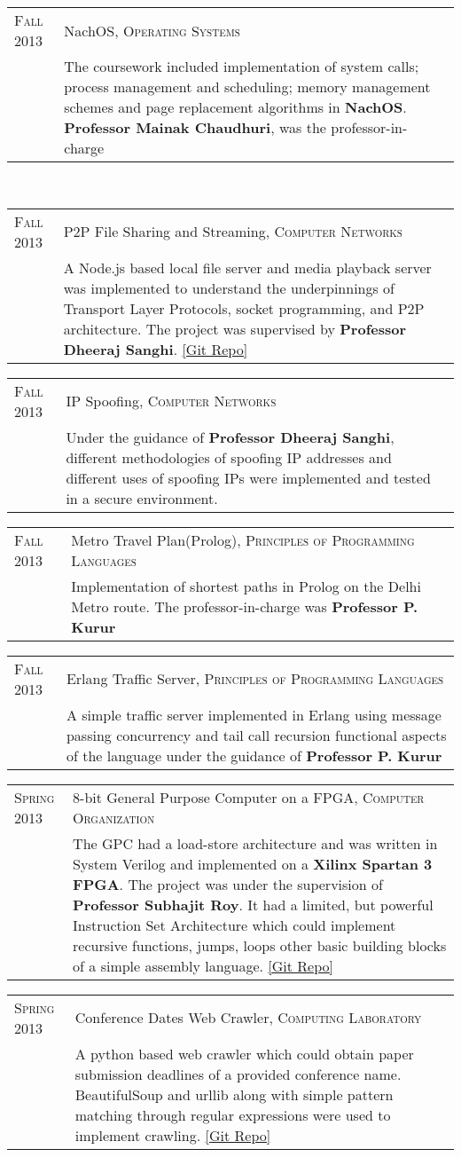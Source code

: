 \documentclass[a4paper,10pt]{article} %
\newcommand{\project}[3]{
    \begin{tabular}{>{\raggedleft}p{2.2cm}|p{16.5cm}}
        \textsc{#1} & #2 \\
                    & \footnotesize{#3} \\
    \end{tabular}
}
\begin{document}
\project {Fall 2013}
         {NachOS, \textsc{Operating Systems}}
         {The coursework included implementation of system calls; process
          management and scheduling; memory management schemes and page replacement
          algorithms in \textbf{NachOS}. \textbf{Professor Mainak Chaudhuri}, was
          the professor-in-charge}\\

\project {Fall 2013}
         {P2P File Sharing and Streaming, \textsc{Computer Networks}}
         {A Node.js based local file server and media playback server was implemented
          to understand the underpinnings of Transport Layer Protocols, socket programming,
          and P2P architecture.  The project was supervised by \textbf{Professor Dheeraj Sanghi}.
          \href{https://github.com/srijanshetty/nodesock} {[Git Repo]}}

\project {Fall 2013}
         {IP Spoofing, \textsc{Computer Networks}}
         {Under the guidance of \textbf{Professor Dheeraj Sanghi}, different methodologies
          of spoofing IP addresses and different uses of spoofing IPs were implemented and tested
          in a secure environment.}

\project {Fall 2013}
         {Metro Travel Plan(Prolog), \textsc{Principles of Programming Languages}}
         {Implementation of shortest paths in Prolog on the Delhi Metro route.
          The professor-in-charge was \textbf{Professor P. Kurur}}

\project {Fall 2013}
         {Erlang Traffic Server, \textsc{Principles of Programming Languages}}
         {A simple traffic server implemented in Erlang using message passing
          concurrency and tail call recursion functional aspects of the language under the
          guidance of \textbf{Professor P. Kurur}}

\project {Spring 2013}
         {8-bit General Purpose Computer on a FPGA, \textsc{Computer Organization}}
         {The GPC had a load-store architecture and was written in System Verilog and
          implemented on a \textbf{Xilinx Spartan 3 FPGA}.  The project was under the
          supervision of \textbf{Professor Subhajit Roy}.  It had a limited, but powerful
          Instruction Set Architecture which could implement recursive functions, jumps,
          loops  other basic building blocks of a simple assembly language.
          \href{https://github.com/srijanshetty/220_y11} {[Git Repo]}}

\project {Spring 2013}
         {Conference Dates Web Crawler, \textsc{Computing Laboratory}}
         {A python based web crawler which could obtain paper submission
          deadlines of a provided conference name.  BeautifulSoup and urllib along
          with simple pattern matching through regular expressions were used to implement crawling.
          \href{https://github.com/srijanshetty/crawler} {[Git Repo]}}
\end{document}
